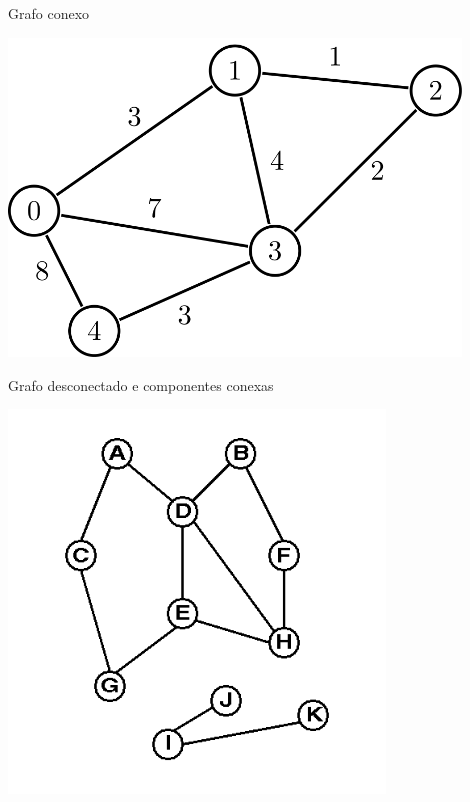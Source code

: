 \documentclass[compress,mathserif]{beamer}
\begin{document}
\begin{frame}{Grafo conexo}

\vspace{1cm}

\centering \includegraphics[width=0.9\textwidth]{images/pesos.png}

\end{frame}


\begin{frame}{Grafo desconectado e componentes conexas}

\vspace{0.5cm}

\centering \includegraphics[width=0.75\textwidth]{images/desconectado.png}

\end{frame}
\end{document}
